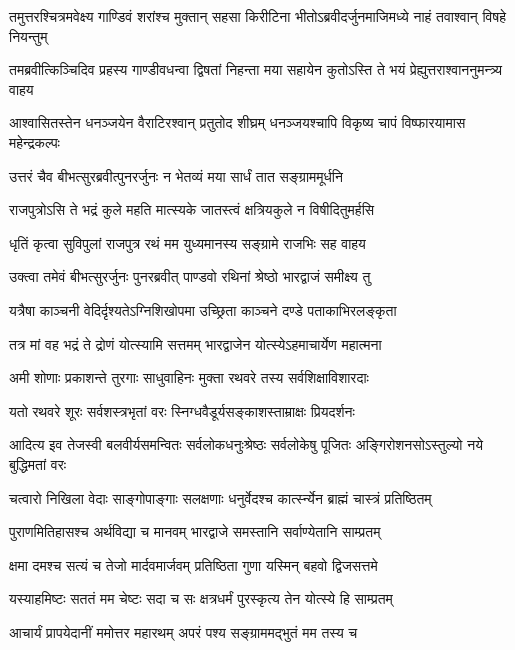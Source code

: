 \fourlineindentedshloka
{तमुत्तरश्चित्रमवेक्ष्य गाण्डिवं}
{शरांश्च मुक्तान् सहसा किरीटिना}
{भीतोऽब्रवीदर्जुनमाजिमध्ये}
{नाहं तवाश्वान् विषहे नियन्तुम्}


\fourlineindentedshloka
{तमब्रवीत्किञ्चिदिव प्रहस्य}
{गाण्डीवधन्वा द्विषतां निहन्ता}
{मया सहायेन कुतोऽस्ति ते भयं}
{प्रेह्युत्तराश्वाननुमन्त्र्य वाहय}



\fourlineindentedshloka
{आश्वासितस्तेन धनञ्जयेन}
{वैराटिरश्वान् प्रतुतोद शीघ्रम्}
{धनञ्जयश्चापि विकृष्य चापं}
{विष्फारयामास महेन्द्रकल्पः}


\twolineshloka
{उत्तरं चैव बीभत्सुरब्रवीत्पुनरर्जुनः}
{न भेतव्यं मया सार्धं तात सङ्ग्राममूर्धनि}


\twolineshloka
{राजपुत्रोऽसि ते भद्रं कुले महति मात्स्यके}
{जातस्त्वं क्षत्रियकुले न विषीदितुमर्हसि}


\twolineshloka
{धृतिं कृत्वा सुविपुलां राजपुत्र रथं मम}
{युध्यमानस्य सङ्ग्रामे राजभिः सह वाहय}


\twolineshloka
{उक्त्वा तमेवं बीभत्सुरर्जुनः पुनरब्रवीत्}
{पाण्डवो रथिनां श्रेष्ठो भारद्वाजं समीक्ष्य तु}


\twolineshloka
{यत्रैषा काञ्चनी वेदिर्दृश्यतेऽग्निशिखोपमा}
{उच्छ्रिता काञ्चने दण्डे पताकाभिरलङ्कृता}


\twolineshloka
{तत्र मां वह भद्रं ते द्रोणं योत्स्यामि सत्तमम्}
{भारद्वाजेन योत्स्येऽहमाचार्येण महात्मना}


\twolineshloka
{अमी शोणाः प्रकाशन्ते तुरगाः साधुवाहिनः}
{मुक्ता रथवरे तस्य सर्वशिक्षाविशारदाः}


\twolineshloka
{यतो रथवरे शूरः सर्वशस्त्रभृतां वरः}
{स्निग्धवैडूर्यसङ्काशस्ताम्राक्षः प्रियदर्शनः}


\threelineshloka
{आदित्य इव तेजस्वी बलवीर्यसमन्वितः}
{सर्वलोकधनुःश्रेष्ठः सर्वलोकेषु पूजितः}
{अङ्गिरोशनसोऽस्तुल्यो नये बुद्धिमतां वरः}


\twolineshloka
{चत्वारो निखिला वेदाः साङ्गोपाङ्गाः सलक्षणाः}
{धनुर्वेदश्च कार्त्स्न्येन ब्राह्मं चास्त्रं प्रतिष्ठितम्}


\twolineshloka
{पुराणमितिहासश्च अर्थविद्या च मानवम्}
{भारद्वाजे समस्तानि सर्वाण्येतानि साम्प्रतम्}


\twolineshloka
{क्षमा दमश्च सत्यं च तेजो मार्दवमार्जवम्}
{प्रतिष्ठिता गुणा यस्मिन् बहवो द्विजसत्तमे}


\twolineshloka
{यस्याहमिष्टः सततं मम चेष्टः सदा च सः}
{क्षत्रधर्मं पुरस्कृत्य तेन योत्स्ये हि साम्प्रतम्}


\twolineshloka
{आचार्यं प्रापयेदानीं ममोत्तर महारथम्}
{अपरं पश्य सङ्ग्राममद्भुतं मम तस्य च}



